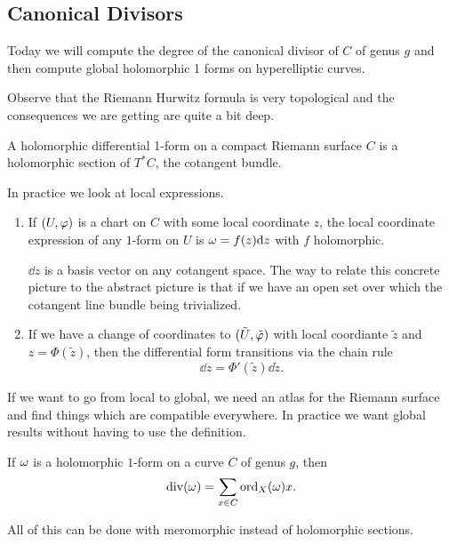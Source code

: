 \documentclass[12pt]{memoir}
\begin{document}
\subsection{Canonical Divisors}

Today we will compute the degree of the canonical divisor of $C$ of genus $g$ and then compute global holomorphic 1 forms on hyperelliptic curves.\par

\begin{Rmk}
    Observe that the Riemann Hurwitz formula is very topological and the consequences we are getting are quite a bit deep.
\end{Rmk}

\begin{Def}
    A holomorphic differential 1-form on a compact Riemann surface $C$ is a holomorphic section of $T^\ast C$, the cotangent bundle. 
\end{Def}

In practice we look at local expressions.

\begin{enumerate}
    \item If $(U,\varphi)$ is a chart on $C$ with some local coordinate $z$, the local coordinate expression of any $1$-form on $U$ is $\omega= f(z)\dd z$ with $f$ holomorphic.\par
    $\dd z$ is a basis vector on any cotangent space. The way to relate this concrete picture to the abstract picture is that if we have an open set over which the cotangent line bundle being trivialized. 
    \item If we have a change of coordinates to $(\tilde{U},\tilde{\varphi})$ with local coordiante $\tilde{z}$ and $z=\Phi(\tilde{z})$, then the differential form transitions via the chain rule 
    $$\dd z=\Phi'(\tilde{z})\dd\tilde{z}.$$
\end{enumerate}

If we want to go from local to global, we need an atlas for the Riemann surface and find things which are compatible everywhere. In practice we want global results without having to use the definition. 

\begin{Def}
    If $\omega$ is a holomorphic $1$-form on a curve $C$ of genus $g$, then 
    $$\operatorname{div}(\omega)=\sum_{x\in C}\operatorname{ord}_X(\omega)x.$$
\end{Def}

\begin{Rmk}
    All of this can be done with meromorphic instead of holomorphic sections. 
\end{Rmk}
\end{document}
